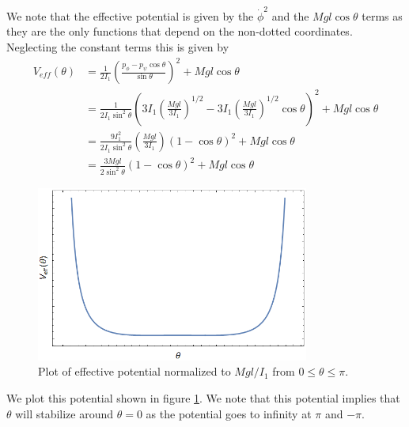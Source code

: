 \documentclass[11pt]{article}
\numberwithin{equation}{section}
\begin{document}
\begin{enumerate}[(a)]
We note that the effective potential is given by the $\dot{\phi}^2$ and the $Mgl\cos\theta$
terms as they are the only functions that depend on the non-dotted coordinates. Neglecting 
the constant terms this is given by
\begin{align*}
V_{eff}(\theta) &= \frac{1}{2I_1}\left(\frac{p_{\phi}-p_{\psi}\cos\theta}{\sin\theta}\right)^2 + Mgl\cos\theta\\
&= \frac{1}{2I_1\sin^2\theta}\left(3I_1\left(\frac{Mgl}{3I_1}\right)^{1/2}-3I_1\left(\frac{Mgl}{3I_1}\right)^{1/2}\cos\theta\right)^2 + Mgl\cos\theta\\
&= \frac{9I_1^2}{2I_1\sin^2\theta}\left(\frac{Mgl}{3I_1}\right)\left(1-\cos\theta\right)^2 + Mgl\cos\theta\\
&= \frac{3Mgl}{2\sin^2\theta}\left(1-\cos\theta\right)^2 + Mgl\cos\theta
\end{align*}
\begin{figure}
\centering
\includegraphics[width=0.8\textwidth]{figure.png}
\caption{Plot of effective potential normalized to $Mgl/I_1$ from $0\le\theta\le{\pi}$.}
\label{figure}
\end{figure}
We plot this potential shown in figure \ref{figure}. We note that this potential implies that
$\theta$ will stabilize around $\theta=0$ as the potential goes to infinity at $\pi$ and $-\pi$.


\end{enumerate}
\end{document}
